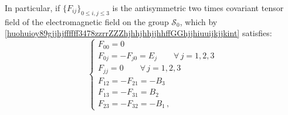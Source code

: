 \documentclass{article}
\theoremstyle{definition}
\theoremstyle{remark}
\newcommand{\er}{\eqref}
\newcommand{\er}{\eqref}
\begin{document}
\begin{comment}
\er{khjhhkfgjfjhgghhgjghjhjkkkkgjghghuiiiulkkjlkklKKgfgjhjjghgjh1int}
as
\begin{equation}\label{khjhhkfgjfjhgghhgjghjhjkkkkgjghghuiiiulkkjlkklKKgfgjhjjghgjhhjhjint}
\begin{cases}
c^{00}=0
\\
c^{mm}=0 \quad\forall\, m=1,2,3,
\\
c^{0m}=-c^{m0}=
-c_{0m}+\sum_{k=1}^{3}\frac{v_k}{c}c_{mk} \quad\forall\, m=1,2,3,
\\
c^{mn}=\frac{v_m}{c}c^{0n}-\frac{v_n}{c}c^{0m}
+c_{mn}\quad\forall\, m,n=1,2,3.
\end{cases}
\end{equation}
\end{comment}
%
%
%
In particular, if $\{F_{ij}\}_{0\leq i,j\leq 3}$ is the
antisymmetric two times covariant tensor field of the
electromagnetic field on the group $\mathcal{S}_0$, which by
\er{huohuioy89gjjhjffffff3478zzrrZZZhjhhjhhjjhhffGGhjjhiuuijkjjkint}
satisfies:
\begin{equation}\label{huohuioy89gjjhjffffff3478zzrrZZZhjhhjhhjjhhffGGhjjhiuuijkjjkihjhjhint}
\begin{cases}
F_{00}=0\\ F_{0j}=-F_{j0}=E_j\quad\quad\forall\, j=1,2,3\\
F_{jj}=0\quad\quad\forall\, j=1,2,3
\\
F_{12}=-F_{21}=-B_3
\\
F_{13}=-F_{31}=B_2
\\
F_{23}=-F_{32}=-B_1\,,
\end{cases}
\end{equation}
\end{document}
